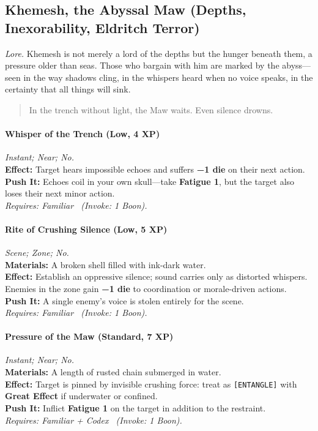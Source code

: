 
\subsection{Khemesh, the Abyssal Maw (Depths, Inexorability, Eldritch Terror)}
\textit{Lore.} Khemesh is not merely a lord of the depths but the hunger beneath them, a pressure older than seas. Those who bargain with him are marked by the abyss—seen in the way shadows cling, in the whispers heard when no voice speaks, in the certainty that all things will sink.

\begin{quote}
In the trench without light, the Maw waits. Even silence drowns.
\end{quote}

\paragraph{Whisper of the Trench (Low, 4 XP)} \emph{Instant; Near; No.}\\
\textbf{Effect:} Target hears impossible echoes and suffers \textbf{−1 die} on their next action.\\
\textbf{Push It:} Echoes coil in your own skull—take \textbf{Fatigue 1}, but the target also loses their next minor action.\\
\emph{Requires: Familiar \ (\textit{Invoke:} 1 Boon).}

\paragraph{Rite of Crushing Silence (Low, 5 XP)} \emph{Scene; Zone; No.}\\
\textbf{Materials:} A broken shell filled with ink-dark water.\\
\textbf{Effect:} Establish an oppressive silence; sound carries only as distorted whispers. Enemies in the zone gain \textbf{−1 die} to coordination or morale-driven actions.\\
\textbf{Push It:} A single enemy’s voice is stolen entirely for the scene.\\
\emph{Requires: Familiar \ (\textit{Invoke:} 1 Boon).}

\paragraph{Pressure of the Maw (Standard, 7 XP)} \emph{Instant; Near; No.}\\
\textbf{Materials:} A length of rusted chain submerged in water.\\
\textbf{Effect:} Target is pinned by invisible crushing force: treat as \texttt{[ENTANGLE]} with \textbf{Great Effect} if underwater or confined.\\
\textbf{Push It:} Inflict \textbf{Fatigue 1} on the target in addition to the restraint.\\
\emph{Requires: Familiar + Codex \ (\textit{Invoke:} 1 Boon).}


